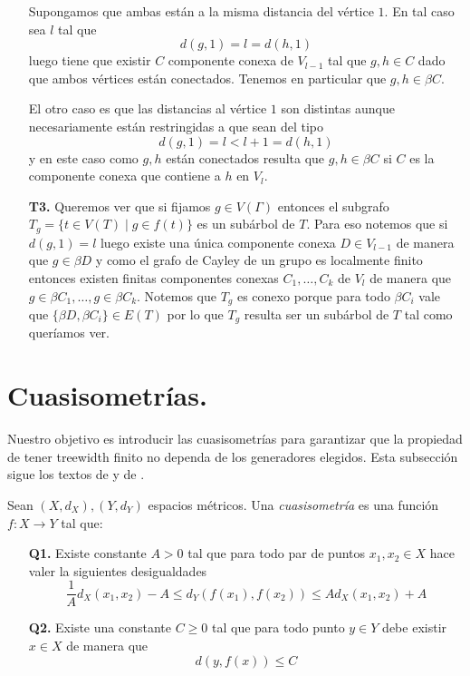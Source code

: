 \documentclass[tesis.tex]{subfiles}
\begin{document}
\begin{ej}
\begin{enumerate}
		Supongamos que ambas están a la misma distancia del vértice $1$. 
		En tal caso sea $l$ tal que 
		\[
			d(g,1)= l = d(h,1)
		\] 
		luego tiene que existir $C$ componente conexa de $V_{l-1}$ 
		tal que $g,h \in C$ dado que ambos vértices están conectados.
		Tenemos en particular que $g,h \in \beta C$.
		
		
		El otro caso es que las distancias al vértice $1$ son distintas aunque necesariamente están restringidas a que sean del tipo
		\[
			d(g,1)= l < l+1 = d(h,1)
		\] 
		y en este caso como $g,h$ están conectados resulta que $g,h \in \beta C$ si $C$ es la componente conexa que contiene a $h$ en $V_l$.
		
		\item[\textbf{T3.}] Queremos ver que si fijamos $g \in V(\Gamma)$ entonces el subgrafo $T_{g} = \{ t \in V(T) \mid g \in f(t) \} $ es un subárbol de $T$.
		Para eso notemos que si $d(g,1) = l$ luego
		existe una única componente conexa $D \in V_{l-1}$ de manera que $g \in \beta D$ y como el grafo de Cayley de un grupo \fg es localmente finito entonces existen finitas componentes conexas $C_{1}, \dots, C_{k}$ de $V_{l}$ de manera que $g \in \beta C_{1}, \dots, g \in \beta C_{k}$.
		Notemos que $T_{g}$ es conexo porque para todo $\beta C_{i}$ vale que $\{ \beta D, \beta C_{i} \} \in E(T)$ por lo que $T_{g}$ resulta ser un subárbol de $T$ tal como queríamos ver.
		 
		
	\end{enumerate}
\end{ej}

\section{Cuasisometrías.}\label{secc_qi}

Nuestro objetivo es introducir las cuasisometrías para garantizar que la propiedad de tener treewidth finito no dependa de los generadores elegidos.
Esta subsección sigue los textos de \cite{bridson2013metric} y de \cite{loh2017geometric}.

\begin{deff}
	Sean $(X,d_X),(Y,d_Y)$ espacios métricos. 
	Una \emph{cuasisometría} es una función $f:X \to Y$ tal que:
	\begin{itemize}
		\item[\textbf{Q1.}] Existe constante $A > 0$ tal que para todo par de puntos $x_1,x_2 \in X$ hace valer la siguientes desigualdades
		\[
		\frac{1}{A} d_X(x_1,x_2) - A \le d_Y(f(x_1),f(x_2)) \le A d_X(x_1,x_2) + A
		\]
		\item[\textbf{Q2.}] Existe una constante $C \ge 0$ tal que para todo punto $y \in Y$ debe existir $x \in X$ de manera que 
		\[
		d(y,f(x)) \le C
		\]
	\end{itemize}
\end{deff}
\end{document}

